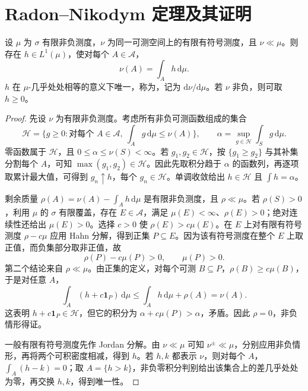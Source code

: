 \documentclass[UTF8,12pt,a4paper,fontset=fandol]{ctexbook}
\begin{document}
\section{Radon--Nikodym 定理及其证明}
\begin{theorem}
设 $\mu$ 为 $\sigma$ 有限非负测度，$\nu$ 为同一可测空间上的有限有符号测度，且 $\nu\ll\mu$。则存在 $h\in L^1(\mu)$，使对每个 $A\in\mathcal A$，
\begin{equation}
 \nu(A)=\int_Ah\,\mathrm d\mu.
 \label{eq:mt-radon-nikodym}
\end{equation}
$h$ 在 $\mu$-几乎处处相等的意义下唯一，称为，记为 $\mathrm d\nu/\mathrm d\mu$。若 $\nu$ 非负，则可取 $h\geq0$。
\label{thm:mt-rn}
\end{theorem}
\begin{proof}
先设 $\nu$ 为有限非负测度。考虑所有非负可测函数组成的集合
\[
 \mathcal H=\{g\geq0:\text{对每个 }A\in\mathcal A,\ \int_Ag\,\mathrm d\mu\leq\nu(A)\},
 \qquad \alpha=\sup_{g\in\mathcal H}\int_Sg\,\mathrm d\mu.
\]
零函数属于 $\mathcal H$，且 $0\leq\alpha\leq\nu(S)<\infty$。若 $g_1,g_2\in\mathcal H$，按 $\{g_1\geq g_2\}$ 与其补集分割每个 $A$，可知 $\max(g_1,g_2)\in\mathcal H$。因此先取积分趋于 $\alpha$ 的函数列，再逐项取累计最大值，可得到 $g_n\uparrow h$，每个 $g_n\in\mathcal H$。单调收敛给出 $h\in\mathcal H$ 且 $\int h=\alpha$。

剩余质量 $\rho(A)=\nu(A)-\int_Ah\,\mathrm d\mu$ 是有限非负测度，且 $\rho\ll\mu$。若 $\rho(S)>0$，利用 $\mu$ 的 $\sigma$ 有限覆盖，存在 $E\in\mathcal A$，满足 $\mu(E)<\infty$、$\rho(E)>0$；绝对连续性还给出 $\mu(E)>0$。选择 $c>0$ 使 $\rho(E)>c\mu(E)$。在 $E$ 上对有限有符号测度 $\rho-c\mu$ 应用 Hahn 分解，得到正集 $P\subseteq E$。因为该有符号测度在整个 $E$ 上取正值，而负集部分取非正值，故
\[
 \rho(P)-c\mu(P)>0,\qquad \mu(P)>0.
\]
第二个结论来自 $\rho\ll\mu$。由正集的定义，对每个可测 $B\subseteq P$，$\rho(B)\geq c\mu(B)$，于是对任意 $A$，
\[
 \int_A(h+c\mathbf1_P)\,\mathrm d\mu
 \leq\int_Ah\,\mathrm d\mu+\rho(A)=\nu(A).
\]
这表明 $h+c\mathbf1_P\in\mathcal H$，但它的积分为 $\alpha+c\mu(P)>\alpha$，矛盾。因此 $\rho=0$，非负情形得证。

一般有限有符号测度先作 Jordan 分解。由 $\nu\ll\mu$ 可知 $\nu^\pm\ll\mu$，分别应用非负情形，再将两个可积密度相减，得到 $h$。若 $h,k$ 都表示 $\nu$，则对每个 $A$，$\int_A(h-k)=0$；取 $A=\{h>k\}$，非负零积分判别给出该集合上的差几乎处处为零，再交换 $h,k$，得到唯一性。
\end{proof}
\end{document}
